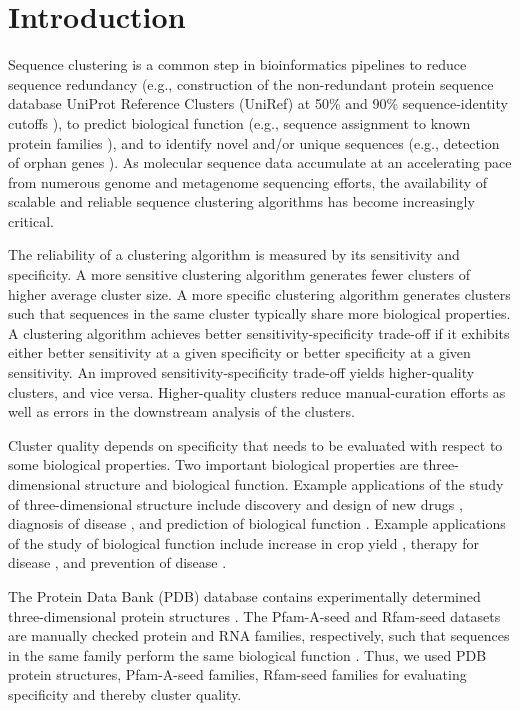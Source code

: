 \documentclass{bioinfo}
\begin{document}
\section{Introduction}

Sequence clustering is a common step in bioinformatics pipelines to reduce sequence redundancy (e.g., construction of the non-redundant protein sequence database UniProt Reference Clusters (UniRef) at 50\% and 90\% sequence-identity cutoffs \citep{suzek2007uniref}), to predict biological function (e.g., sequence assignment to known protein families \citep{finn2016pfam}), and to identify novel and/or unique sequences (e.g., detection of orphan genes \citep{prabh2016orphan}). As molecular sequence data accumulate at an accelerating pace from numerous genome and metagenome sequencing efforts, the availability of scalable and reliable sequence clustering algorithms has become increasingly critical.

The reliability of a clustering algorithm is measured by its sensitivity and specificity.
A more sensitive clustering algorithm generates fewer clusters of higher average cluster size.
A more specific clustering algorithm generates clusters such that sequences in the same cluster typically share more biological properties.
A clustering algorithm achieves better sensitivity-specificity trade-off if it exhibits either better sensitivity at a given specificity or better specificity at a given sensitivity.
An improved sensitivity-specificity trade-off yields higher-quality clusters, and vice versa.
Higher-quality clusters reduce manual-curation efforts as well as errors in the downstream analysis of the clusters.


Cluster quality depends on specificity that needs to be evaluated with respect to some biological properties.
Two %
important biological properties are three-dimensional structure and biological function.
Example applications of the study of three-dimensional structure include
discovery and design of new drugs  \citep{kryger1999structure}, 
diagnosis of disease \citep{gniadecka2004melanoma}, and
prediction of biological function \citep{berg2002protein}.
Example applications of the study of biological function include
increase in crop yield \citep{xu2011functions},
therapy for disease \citep{cowen2009harnessing,egen2002ctla}, and
prevention of disease \citep{kris2004bioactive}.

The Protein Data Bank (PDB) database contains experimentally determined three-dimensional protein structures \citep{berman2006protein}.
The Pfam-A-seed and Rfam-seed datasets are manually checked protein and RNA families, respectively, such that sequences in the same family perform the same biological function \citep{finn2016pfam,nawrocki2014rfam}.
Thus, we used PDB protein structures, Pfam-A-seed families,  Rfam-seed families for evaluating specificity and thereby cluster quality.
\end{document}
